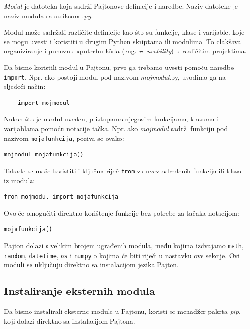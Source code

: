 \textit{Modul} je datoteka koja sadrži Pajtonove definicije i naredbe. Naziv datoteke je naziv modula sa sufiksom .\textit{py}.

Modul može sadržati različite definicije kao što su funkcije, klase i varijable, koje se mogu uvesti i koristiti u drugim Python skriptama ili modulima. To olakšava organiziranje i ponovnu upotrebu k\^oda (eng. \emph{re-usability}) u različitim projektima.

Da bismo koristili modul u Pajtonu, prvo ga trebamo uvesti pomoću naredbe \texttt{import}. Npr. ako postoji modul pod nazivom \textit{mojmodul}.py, uvodimo  ga na sljedeći način:
\begin{verbatim}
	import mojmodul
\end{verbatim}


Nakon što je modul uveden, pristupamo njegovim funkcijama, klasama i varijablama pomoću notacije tačka. Npr. ako \textit{mojmodul} sadrži funkciju pod nazivom \texttt{mojafunkcija}, poziva se ovako:
\begin{verbatim}
mojmodul.mojafunkcija()
\end{verbatim}

Takođe se može koristiti i ključna riječ \texttt{from} za uvoz određenih funkcija ili klasa iz modula:
\begin{verbatim}
from mojmodul import mojafunkcija
\end{verbatim}

Ovo će omogućiti direktno korištenje funkcije bez potrebe za tačaka notacijom:

\begin{verbatim}
mojafunkcija()

\end{verbatim}

Pajton dolazi s velikim brojem ugrađenih modula, među kojima izdvajamo \texttt{math}, \texttt{random}, \texttt{datetime}, \texttt{os} i \texttt{numpy} o kojima će biti riječi u nastavku ove sekcije. Ovi moduli se uključuju direktno sa instalacijom jezika Pajton.
 

\subsection{Instaliranje eksternih modula} 


Da bismo instalirali eksterne module u Pajtonu,   koristi se menadžer paketa \textit{pip}, koji dolazi direktno sa instalacijom Pajtona. 


